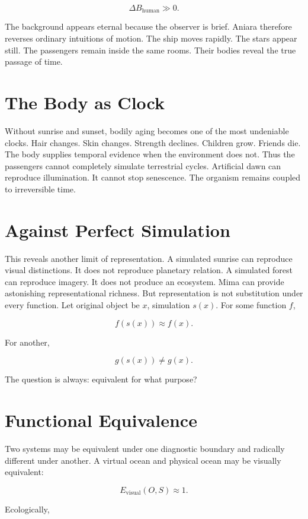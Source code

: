 \documentclass[11pt,oneside]{book}
\theoremstyle{definition}
\theoremstyle{remark}
\begin{document}
\[
\Delta B_{\mathrm{human}}\gg0.
\]

The background appears eternal because the observer is brief. Aniara therefore reverses ordinary
intuitions of motion. The ship moves rapidly. The stars appear still. The passengers remain inside
the same rooms. Their bodies reveal the true passage of time.

\section{The Body as Clock}

Without sunrise and sunset, bodily aging becomes one of the most undeniable clocks. Hair changes.
Skin changes. Strength declines. Children grow. Friends die. The body supplies temporal evidence
when the environment does not. Thus the passengers cannot completely simulate terrestrial cycles.
Artificial dawn can reproduce illumination. It cannot stop senescence. The organism remains coupled
to irreversible time.

\section{Against Perfect Simulation}

This reveals another limit of representation. A simulated sunrise can reproduce visual distinctions.
It does not reproduce planetary relation. A simulated forest can reproduce imagery. It does not
produce an ecosystem. Mima can provide astonishing representational richness. But representation is
not substitution under every function. Let original object be \(x\), simulation \(s(x)\). For some
function \(f\),

\[
f(s(x))\approx f(x).
\]

For another,

\[
g(s(x))\neq g(x).
\]

The question is always: equivalent for what purpose?

\section{Functional Equivalence}

Two systems may be equivalent under one diagnostic boundary and radically different under another. A
virtual ocean and physical ocean may be visually equivalent:

\[
E_{\mathrm{visual}}(O,S)\approx1.
\]

Ecologically,
\end{document}

